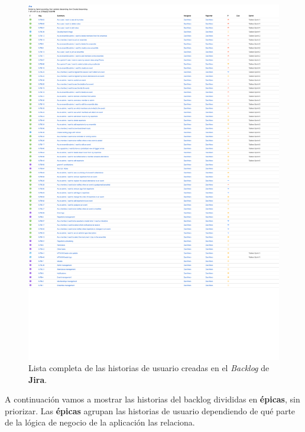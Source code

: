 \begin{figure}[h]
\centering
\captionsetup{justification=centering}
\includegraphics[width=\textwidth]{imagenes/disenyo_tecnico/jira_todos.pdf}
\caption{Lista completa de las historias de usuario creadas en el \textit{Backlog} de \textbf{Jira}.}
\label{fig:jiraTodos}
\end{figure}

A continuación vamos a mostrar las historias del backlog divididas en \textbf{épicas}, sin priorizar. Las \textbf{épicas} agrupan las historias de usuario dependiendo de qué parte de la lógica de negocio de la aplicación las relaciona.

